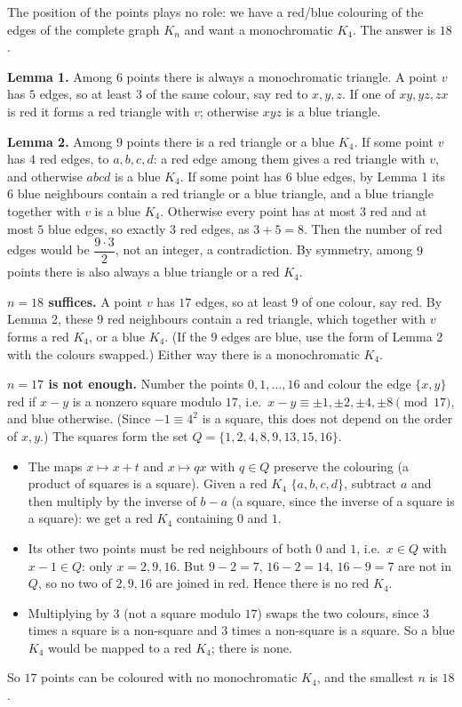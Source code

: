 The position of the points plays no role: we have a red/blue colouring of the edges of the complete graph $K_n$ and want a monochromatic $K_4$. The answer is $\boxed{18}$.

\textbf{Lemma 1.} Among $6$ points there is always a monochromatic triangle. A point $v$ has $5$ edges, so at least $3$ of the same colour, say red to $x,y,z$. If one of $xy,yz,zx$ is red it forms a red triangle with $v$; otherwise $xyz$ is a blue triangle.

\textbf{Lemma 2.} Among $9$ points there is a red triangle or a blue $K_4$. If some point $v$ has $4$ red edges, to $a,b,c,d$: a red edge among them gives a red triangle with $v$, and otherwise $abcd$ is a blue $K_4$. If some point has $6$ blue edges, by Lemma 1 its $6$ blue neighbours contain a red triangle or a blue triangle, and a blue triangle together with $v$ is a blue $K_4$. Otherwise every point has at most $3$ red and at most $5$ blue edges, so exactly $3$ red edges, as $3+5=8$. Then the number of red edges would be $\dfrac{9\cdot3}{2}$, not an integer, a contradiction. By symmetry, among $9$ points there is also always a blue triangle or a red $K_4$.

\textbf{$n=18$ suffices.} A point $v$ has $17$ edges, so at least $9$ of one colour, say red. By Lemma 2, these $9$ red neighbours contain a red triangle, which together with $v$ forms a red $K_4$, or a blue $K_4$. (If the $9$ edges are blue, use the form of Lemma 2 with the colours swapped.) Either way there is a monochromatic $K_4$.

\textbf{$n=17$ is not enough.} Number the points $0,1,\dots,16$ and colour the edge $\{x,y\}$ red if $x-y$ is a nonzero square modulo $17$, i.e.\ $x-y\equiv\pm1,\pm2,\pm4,\pm8\pmod{17}$, and blue otherwise. (Since $-1\equiv4^2$ is a square, this does not depend on the order of $x,y$.) The squares form the set $Q=\{1,2,4,8,9,13,15,16\}$.
\begin{itemize}
\item The maps $x\mapsto x+t$ and $x\mapsto qx$ with $q\in Q$ preserve the colouring (a product of squares is a square). Given a red $K_4$ $\{a,b,c,d\}$, subtract $a$ and then multiply by the inverse of $b-a$ (a square, since the inverse of a square is a square): we get a red $K_4$ containing $0$ and $1$.
\item Its other two points must be red neighbours of both $0$ and $1$, i.e.\ $x\in Q$ with $x-1\in Q$: only $x=2,9,16$. But $9-2=7$, $16-2=14$, $16-9=7$ are not in $Q$, so no two of $2,9,16$ are joined in red. Hence there is no red $K_4$.
\item Multiplying by $3$ (not a square modulo $17$) swaps the two colours, since $3$ times a square is a non-square and $3$ times a non-square is a square. So a blue $K_4$ would be mapped to a red $K_4$; there is none.
\end{itemize}
So $17$ points can be coloured with no monochromatic $K_4$, and the smallest $n$ is $18$.
